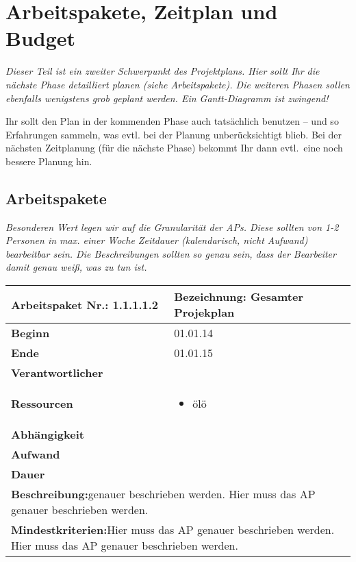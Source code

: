 \documentclass[fontsize=12pt,paper=a4,twoside]{scrartcl}
\begin{document}

\section{Arbeitspakete, Zeitplan und Budget}

{\em Dieser Teil ist ein zweiter Schwerpunkt des Projektplans. Hier sollt Ihr die nächste Phase detailliert planen (siehe Arbeitspakete). Die weiteren Phasen sollen ebenfalls wenigstens grob geplant werden. Ein Gantt-Diagramm ist zwingend! 

Ihr sollt den Plan in der kommenden Phase auch tatsächlich benutzen -- und so
  Erfahrungen sammeln, was evtl. bei der Planung unberücksichtigt
  blieb. Bei der nächsten Zeitplanung (für die nächste Phase) bekommt
  Ihr dann evtl.\ eine noch bessere Planung hin.}

\subsection{Arbeitspakete}\label{aps}


{\em Besonderen Wert legen wir auf die Granularität der APs. Diese
  sollten von 1-2 Personen in max. einer Woche Zeitdauer (kalendarisch, nicht
  Aufwand) bearbeitbar sein. Die Beschreibungen sollten so genau sein,
  dass der Bearbeiter damit genau weiß, was zu tun ist.}
  

\begin{tabular}{|p{5.3cm}|p{9.7cm}|}\hline
   \textbf{Arbeitspaket Nr.:} 1.1.1.1.2 & \textbf{Bezeichnung:} Gesamter Projekplan\\ \hline \hline
   \textbf{Beginn} & 01.01.14\\ \hline
   \textbf{Ende} & 01.01.15\\ \hline
   \textbf{Verantwortlicher} & \\ \hline
   \textbf{Ressourcen} & \begin{itemize}
   \item ölö
 
\end{itemize}    \\ \hline
\textbf{Abhängigkeit} &\\ \hline
 \textbf{Aufwand} & \\ \hline
 \textbf{Dauer} & \\ \hline
   \multicolumn{2}{|p{15cm}|}{\textbf{Beschreibung:}\newline   genauer beschrieben werden. Hier muss das AP genauer beschrieben werden. }\\ \hline
    \multicolumn{2}{|p{15cm}|}{\textbf{Mindestkriterien:}\newline  Hier muss das AP genauer beschrieben werden. Hier muss das AP genauer beschrieben werden. }\\ \hline
 \end{tabular}
 
\end{document}
